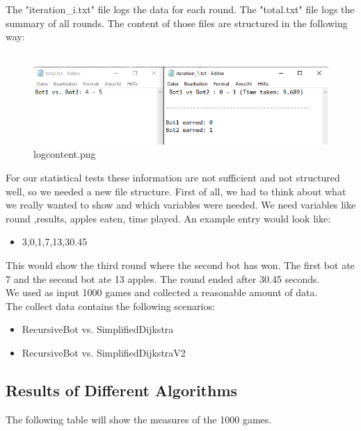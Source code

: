 \documentclass[a4paper,12pt]{article}
\begin{document}
The "iteration\_i.txt" file logs the data for each round. The "total.txt" file logs the summary of all rounds. The content of those files are structured in the following way:\\
\\
\begin{figure}[H]
    \centering
    \includegraphics[scale=0.8]{logs_content}
\caption{logcontent.png}
    \label{fig:logs_content.png}
\end{figure}
For our statistical tests these information are not sufficient and not structured well, so we needed a new file structure. First of all, we had to think about what we really wanted to show and which variables were needed. We need variables like round ,results, apples eaten, time played. An example entry would look like:
\begin{itemize}
	\item 3,0,1,7,13,30.45
\end{itemize}
This would show the third round where the second bot has won. The first bot ate 7 and the second bot ate 13 apples. The round ended after 30.45 seconds.\\
We used as input 1000 games and collected a reasonable amount of data. 
\\The collect data contains the following scenarios:
\begin{itemize}
\item RecursiveBot vs. SimplifiedDijkstra
\item RecursiveBot vs. SimplifiedDijkstraV2
\end{itemize}
\subsection{Results of Different Algorithms}
The following table will show the measures of the 1000 games.\\
\end{document}
